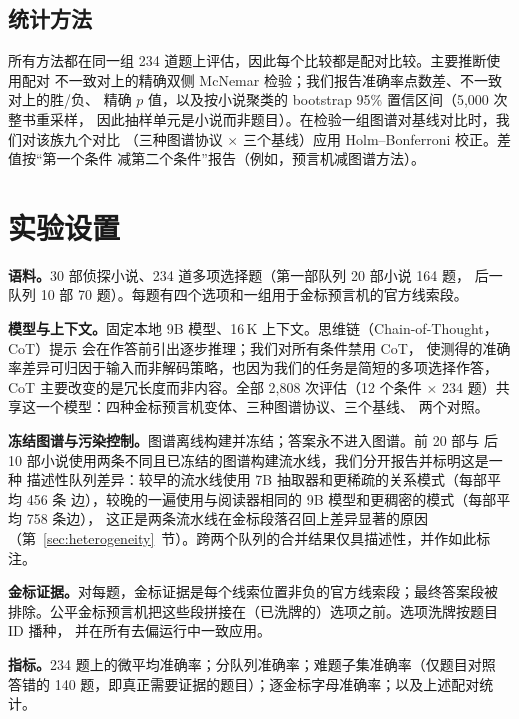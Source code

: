 \documentclass[UTF8,11pt]{ctexart}
\begin{document}
\subsection{统计方法}
\label{sec:stats-method}

所有方法都在同一组 234 道题上评估，因此每个比较都是配对比较。主要推断使用配对
不一致对上的精确双侧 McNemar 检验；我们报告准确率点数差、不一致对上的胜/负、
精确 $p$ 值，以及按小说聚类的 bootstrap 95\% 置信区间（5,000 次整书重采样，
因此抽样单元是小说而非题目）。在检验一组图谱对基线对比时，我们对该族九个对比
（三种图谱协议 $\times$ 三个基线）应用 Holm--Bonferroni 校正。差值按``第一个条件
减第二个条件''报告（例如，预言机减图谱方法）。

\section{实验设置}
\label{sec:setup}

\textbf{语料。}30 部侦探小说、234 道多项选择题（第一部队列 20 部小说 164 题，
后一队列 10 部 70 题）。每题有四个选项和一组用于金标预言机的官方线索段。

\textbf{模型与上下文。}固定本地 9B 模型、16\,K 上下文。思维链（Chain-of-Thought，
CoT）提示 \citep{wei2022chain} 会在作答前引出逐步推理；我们对所有条件禁用 CoT，
使测得的准确率差异可归因于输入而非解码策略，也因为我们的任务是简短的多项选择作答，
CoT 主要改变的是冗长度而非内容。全部 2{,}808 次评估（12 个条件
$\times$ 234 题）共享这一个模型：四种金标预言机变体、三种图谱协议、三个基线、
两个对照。

\textbf{冻结图谱与污染控制。}图谱离线构建并冻结；答案永不进入图谱。前 20 部与
后 10 部小说使用两条不同且已冻结的图谱构建流水线，我们分开报告并标明这是一种
描述性队列差异：较早的流水线使用 7B 抽取器和更稀疏的关系模式（每部平均 456 条
边），较晚的一遍使用与阅读器相同的 9B 模型和更稠密的模式（每部平均 758 条边），
这正是两条流水线在金标段落召回上差异显著的原因
（第~\ref{sec:heterogeneity}~节）。跨两个队列的合并结果仅具描述性，并作如此标注。

\textbf{金标证据。}对每题，金标证据是每个线索位置非负的官方线索段；最终答案段被
排除。公平金标预言机把这些段拼接在（已洗牌的）选项之前。选项洗牌按题目 ID 播种，
并在所有去偏运行中一致应用。

\textbf{指标。}234 题上的微平均准确率；分队列准确率；难题子集准确率（仅题目对照
答错的 140 题，即真正需要证据的题目）；逐金标字母准确率；以及上述配对统计。

\end{document}
